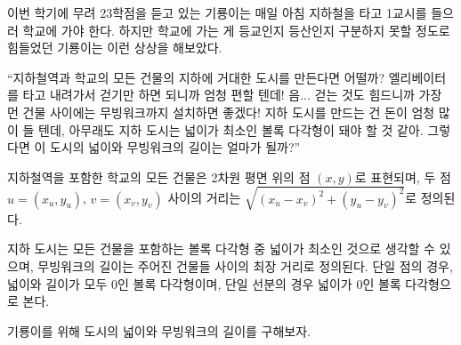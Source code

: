 이번 학기에 무려 23학점을 듣고 있는 기룡이는 매일 아침 지하철을 타고 1교시를 들으러 학교에 가야 한다.
하지만 학교에 가는 게 등교인지 등산인지 구분하지 못할 정도로 힘들었던 기룡이는 이런 상상을 해보았다.

``지하철역과 학교의 모든 건물의 지하에 거대한 도시를 만든다면 어떨까?
엘리베이터를 타고 내려가서 걷기만 하면 되니까 엄청 편할 텐데!
음... 걷는 것도 힘드니까 가장 먼 건물 사이에는 무빙워크까지 설치하면 좋겠다!
지하 도시를 만드는 건 돈이 엄청 많이 들 텐데, 아무래도 지하 도시는 넓이가 최소인 볼록 다각형이 돼야 할 것 같아.
그렇다면 이 도시의 넓이와 무빙워크의 길이는 얼마가 될까?''

지하철역을 포함한 학교의 모든 건물은 2차원 평면 위의 점 $(x, y)$로 표현되며, 두 점 $u = (x_u, y_u)$, $v = (x_v, y_v)$ 사이의 거리는 $\sqrt{(x_u-x_v)^2+(y_u-y_v)^2}$로 정의된다.

지하 도시는 모든 건물을 포함하는 볼록 다각형 중 넓이가 최소인 것으로 생각할 수 있으며, 무빙워크의 길이는 주어진 건물들 사이의 최장 거리로 정의된다.
단일 점의 경우, 넓이와 길이가 모두 0인 볼록 다각형이며, 단일 선분의 경우 넓이가 0인 볼록 다각형으로 본다.

기룡이를 위해 도시의 넓이와 무빙워크의 길이를 구해보자.
